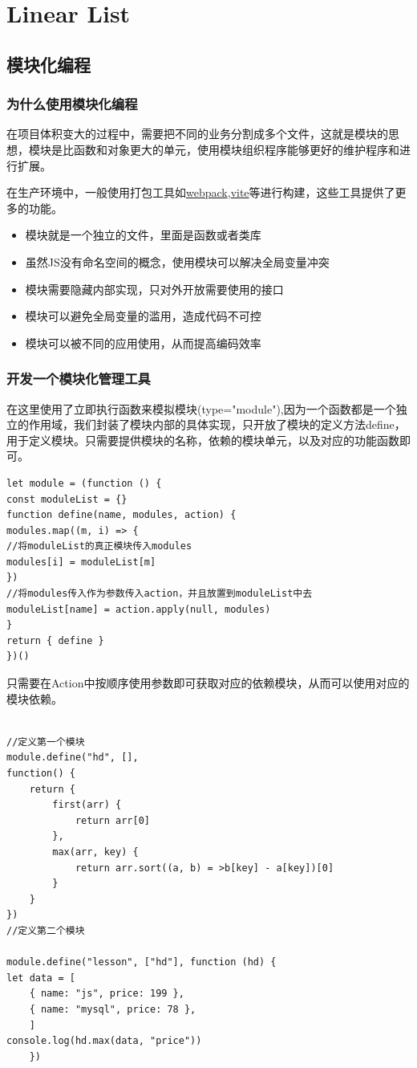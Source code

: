 \documentclass[
	11pt,
	fleqn,
	a4paper,
]{LegrandOrangeBook}
\begin{document}
\part{Linear List}


\chapterspaceabove{6.75cm} %
\chapterspacebelow{7.25cm} %
\chapter{ 模块化编程}
\section{为什么使用模块化编程}
在项目体积变大的过程中，需要把不同的业务分割成多个文件，这就是模块的思想，模块是比函数和对象更大的单元，使用模块组织程序能够更好的维护程序和进行扩展。

在生产环境中，一般使用打包工具如\underline{webpack},\underline{vite}等进行构建，这些工具提供了更多的功能。
\begin{itemize}
    \item 模块就是一个独立的文件，里面是函数或者类库
    \item 虽然JS没有命名空间的概念，使用模块可以解决全局变量冲突
    \item 模块需要隐藏内部实现，只对外开放需要使用的接口
    \item 模块可以避免全局变量的滥用，造成代码不可控
    \item 模块可以被不同的应用使用，从而提高编码效率
\end{itemize}

\section{开发一个模块化管理工具}
在这里使用了立即执行函数来模拟模块(type="module"),因为一个函数都是一个独立的作用域，我们封装了模块内部的具体实现，只开放了模块的定义方法define，用于定义模块。只需要提供模块的名称，依赖的模块单元，以及对应的功能函数即可。
\begin{verbatim}
let module = (function () {
const moduleList = {}
function define(name, modules, action) {
modules.map((m, i) => {
//将moduleList的真正模块传入modules
modules[i] = moduleList[m]
})
//将modules传入作为参数传入action，并且放置到moduleList中去
moduleList[name] = action.apply(null, modules)
}
return { define }
})()
\end{verbatim}
只需要在Action中按顺序使用参数即可获取对应的依赖模块，从而可以使用对应的模块依赖。
\begin{verbatim}

//定义第一个模块
module.define("hd", [],
function() {
    return {
        first(arr) {
            return arr[0]
        },
        max(arr, key) {
            return arr.sort((a, b) = >b[key] - a[key])[0]
        }
    }
})
//定义第二个模块

module.define("lesson", ["hd"], function (hd) {
let data = [
	{ name: "js", price: 199 },
	{ name: "mysql", price: 78 },
	]
console.log(hd.max(data, "price"))
	})
\end{verbatim}
\end{document}
